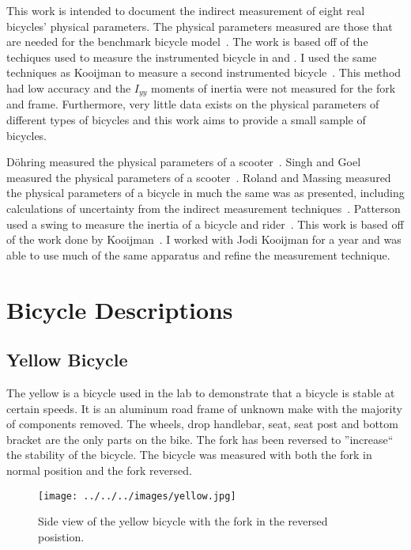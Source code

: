 \documentclass{bmd2010p}
\begin{document}
This work is intended to document the indirect measurement of eight real
bicycles' physical parameters. The physical parameters measured are those that
are needed for the benchmark bicycle model~\cite{Meijaard2007}. The work is
based off of the techiques used to measure the instrumented bicycle in
\cite{Kooijman2006} and \cite{Kooijman2008}. I used the same techniques as
Kooijman to measure a second instrumented bicycle~\cite{Moore2009a}. This
method had low accuracy and the $I_{yy}$ moments of inertia were
not measured for the fork and frame. Furthermore, very little data exists on
the physical parameters of different types of bicycles and this work aims to
provide a small sample of bicycles.

D\"{o}hring measured the physical parameters of a scooter~\cite{Dohring1953}.
Singh and Goel measured the physical parameters of a scooter~\cite{Singh1971}.
Roland and Massing measured the physical parameters of a bicycle in much the
same was as presented, including calculations of uncertainty from the indirect
measurement techniques~\cite{Roland1971}. Patterson used a swing to measure the
inertia of a bicycle and rider~\cite{Patterson2004}. This work is based off of the work
done by Kooijman~\cite{Kooijman2006}. I worked with Jodi Kooijman for a year and
was able to use much of the same apparatus and refine the measurement
technique.

\section{Bicycle Descriptions}
\subsection{Yellow Bicycle}
The yellow is a bicycle used in the lab to demonstrate that a bicycle is stable
at certain speeds. It is an aluminum road frame of unknown make with the
majority of components removed. The wheels, drop handlebar, seat, seat post and
bottom bracket are the only parts on the bike. The fork has been reversed to
''increase`` the stability of the bicycle. The bicycle was measured with both
the fork in normal position and the fork reversed.
\begin{figure}[htbp]
    \begin{center}
        \texttt{[image: ../../../images/yellow.jpg]}
    \end{center}
    \caption{Side view of the yellow bicycle with the fork in the reversed
    posistion.}
    \label{fig:YellowBike}
\end{figure}
\end{document}
